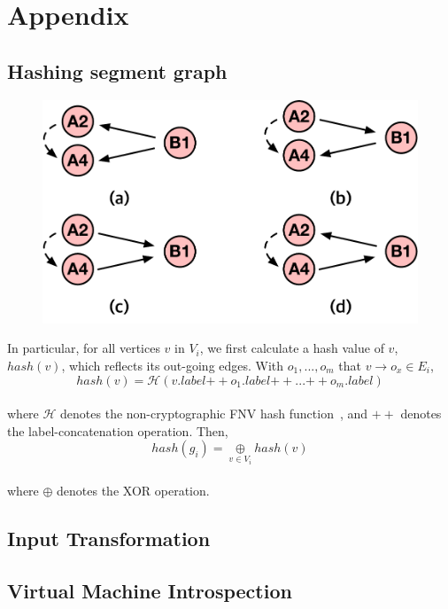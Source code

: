 \section{Appendix}


\subsection{Hashing segment graph}
\label{s:appendix:hash}

\begin{figure}[t]
  \centering
  \includegraphics[width=0.7\linewidth]{fig/interleavingmutation.pdf}
  \caption{}
  \label{fig:segmenthash}
\end{figure}
%

In particular, for all vertices $v$ in $V_i$, we first calculate a
hash value of $v$, $hash(v)$, which reflects its out-going edges. With
$o_1, ..., o_m$ that $v \rightarrow o_x \in E_i$,
%
%
\\[1pt]
\[
  hash(v) = \mathcal{H}(v.label {++} o_1.label {++} ... {++}
  o_m.label)
\]
\\[1pt]
%
where $\mathcal{H}$ denotes the
non-cryptographic FNV hash function~\cite{fnv, fnv-go}, and ${++}$
denotes the label-concatenation operation.
%
Then,
%
\\[1pt]
\[
  hash(g_i) = \underset{v \in V_i}{\oplus} hash(v)
\]
\\[1pt]
%
where $\oplus$ denotes the XOR operation.



\subsection{Input Transformation}
\label{s:appendix:inputtransform}



\subsection{Virtual Machine Introspection}
\label{s:appendix:vmi}

